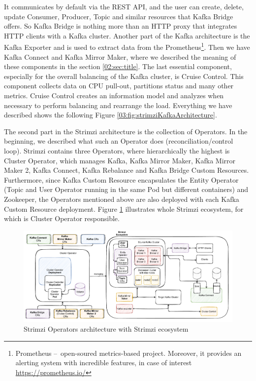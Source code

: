 It communicates by default via the REST API, and the user can create, delete, update Consumer, Producer, Topic and similar resources that Kafka Bridge offers.  So Kafka Bridge is nothing more than an HTTP proxy that integrates HTTP clients with a Kafka cluster. Another part of the Kafka architecture is the Kafka Exporter and is used to extract data from the Prometheus\footnote{Prometheus \---\ open-soured metrics-based project. Moreover, it provides an alerting system with incredible features, in case of interest \url{https://prometheus.io/}}. Then we have Kafka Connect and Kafka Mirror Maker, where we described the meaning of these components in the section \ref{02:sec:title}. The last essential component, especially for the overall balancing of the Kafka cluster, is Cruise Control. This component collects data on CPU pull-out, partitions status and many other metrics. Cruise Control creates an information model and analyzes when necessary to perform balancing and rearrange the load. Everything we have described shows the following Figure \ref{03:fig:strimziKafkaArchitecture}.

The second part in the Strimzi architecture is the collection of Operators. In the beginning, we described what such an Operator does (reconciliation/control loop). Strimzi contains three Operators, where hierarchically the highest is Cluster Operator, which manages Kafka, Kafka Mirror Maker, Kafka Mirror Maker 2, Kafka Connect, Kafka Rebalance and Kafka Bridge Custom Resources. Furthermore, since Kafka Custom Resource encapsulates the Entity Operator (Topic and User Operator running in the same Pod but different containers) and Zookeeper, the Operators mentioned above are also deployed with each Kafka Custom Resource deployment. Figure \ref{03:fig:strimziOperatorsArchitecture} illustrates whole Strimzi ecosystem, for which is Cluster Operator responsible.

\begin{figure}[!ht]
    \centering
    \includegraphics[scale=0.60]{obrazky-figures/02-preliminaries/03-strimzi/04-stirmziOperatorsArch.pdf}
    \caption{Strimzi Operators architecture with Strimzi ecosystem}
    \label{03:fig:strimziOperatorsArchitecture}
\end{figure}

